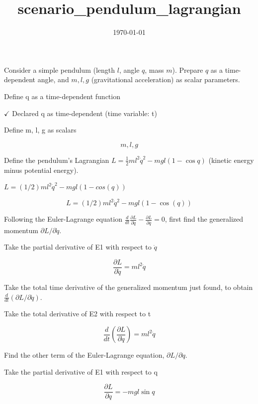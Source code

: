 \documentclass[dvipdfmx]{article}
\title{scenario\_pendulum\_lagrangian}
\date{\today}
\begin{document}
\maketitle

Consider a simple pendulum (length $l$, angle $q$, mass $m$). Prepare $q$ as a time-dependent angle, and $m,l,g$ (gravitational acceleration) as scalar parameters.

Define q as a time-dependent function

$\checkmark$ Declared q as time-dependent (time variable: t)

Define m, l, g as scalars

\[
  m, l, g
\]

Define the pendulum's Lagrangian $L=\frac12ml^2\dot q^2-mgl(1-\cos q)$ (kinetic energy minus potential energy).

$L = (1/2) m l^2 \dot{q}^2 - m g l (1 - cos(q))$

\begin{equation}
  L = (1/2) m l^2 \dot{q}^2 - m g l (1 - \cos(q))
  \label{eq:E1}
\end{equation}

Following the Euler-Lagrange equation $\frac{d}{dt}\frac{\partial L}{\partial\dot q}-\frac{\partial L}{\partial q}=0$, first find the generalized momentum $\partial L/\partial\dot q$.

Take the partial derivative of E1 with respect to $\dot{q}$

\begin{equation}
  \frac{\partial L}{\partial \dot{q}} = m l^2 \dot{q}
  \label{eq:E2}
\end{equation}

Take the total time derivative of the generalized momentum just found, to obtain $\frac{d}{dt}(\partial L/\partial\dot q)$.

Take the total derivative of E2 with respect to t

\begin{equation}
  \frac{d}{dt}\left(\frac{\partial L}{\partial \dot{q}}\right) = m l^2 \ddot{q}
  \label{eq:E3}
\end{equation}

Find the other term of the Euler-Lagrange equation, $\partial L/\partial q$.

Take the partial derivative of E1 with respect to q

\begin{equation}
  \frac{\partial L}{\partial q} = -m g l \sin q
  \label{eq:E4}
\end{equation}
\end{document}
